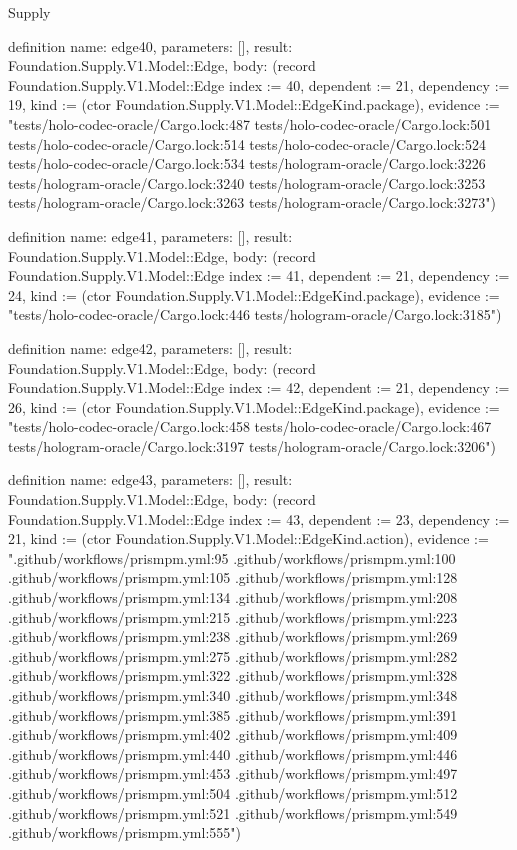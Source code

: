\begin{lexlean}{Supply}
\begin{semanticmodule}
definition{
  name: edge40,
  parameters: [],
  result: Foundation.Supply.V1.Model::Edge,
  body: (record Foundation.Supply.V1.Model::Edge {index := 40, dependent := 21, dependency := 19, kind := (ctor Foundation.Supply.V1.Model::EdgeKind.package), evidence := "tests/holo-codec-oracle/Cargo.lock:487 tests/holo-codec-oracle/Cargo.lock:501 tests/holo-codec-oracle/Cargo.lock:514 tests/holo-codec-oracle/Cargo.lock:524 tests/holo-codec-oracle/Cargo.lock:534 tests/hologram-oracle/Cargo.lock:3226 tests/hologram-oracle/Cargo.lock:3240 tests/hologram-oracle/Cargo.lock:3253 tests/hologram-oracle/Cargo.lock:3263 tests/hologram-oracle/Cargo.lock:3273"})
}

definition{
  name: edge41,
  parameters: [],
  result: Foundation.Supply.V1.Model::Edge,
  body: (record Foundation.Supply.V1.Model::Edge {index := 41, dependent := 21, dependency := 24, kind := (ctor Foundation.Supply.V1.Model::EdgeKind.package), evidence := "tests/holo-codec-oracle/Cargo.lock:446 tests/hologram-oracle/Cargo.lock:3185"})
}

definition{
  name: edge42,
  parameters: [],
  result: Foundation.Supply.V1.Model::Edge,
  body: (record Foundation.Supply.V1.Model::Edge {index := 42, dependent := 21, dependency := 26, kind := (ctor Foundation.Supply.V1.Model::EdgeKind.package), evidence := "tests/holo-codec-oracle/Cargo.lock:458 tests/holo-codec-oracle/Cargo.lock:467 tests/hologram-oracle/Cargo.lock:3197 tests/hologram-oracle/Cargo.lock:3206"})
}

definition{
  name: edge43,
  parameters: [],
  result: Foundation.Supply.V1.Model::Edge,
  body: (record Foundation.Supply.V1.Model::Edge {index := 43, dependent := 23, dependency := 21, kind := (ctor Foundation.Supply.V1.Model::EdgeKind.action), evidence := ".github/workflows/prismpm.yml:95 .github/workflows/prismpm.yml:100 .github/workflows/prismpm.yml:105 .github/workflows/prismpm.yml:128 .github/workflows/prismpm.yml:134 .github/workflows/prismpm.yml:208 .github/workflows/prismpm.yml:215 .github/workflows/prismpm.yml:223 .github/workflows/prismpm.yml:238 .github/workflows/prismpm.yml:269 .github/workflows/prismpm.yml:275 .github/workflows/prismpm.yml:282 .github/workflows/prismpm.yml:322 .github/workflows/prismpm.yml:328 .github/workflows/prismpm.yml:340 .github/workflows/prismpm.yml:348 .github/workflows/prismpm.yml:385 .github/workflows/prismpm.yml:391 .github/workflows/prismpm.yml:402 .github/workflows/prismpm.yml:409 .github/workflows/prismpm.yml:440 .github/workflows/prismpm.yml:446 .github/workflows/prismpm.yml:453 .github/workflows/prismpm.yml:497 .github/workflows/prismpm.yml:504 .github/workflows/prismpm.yml:512 .github/workflows/prismpm.yml:521 .github/workflows/prismpm.yml:549 .github/workflows/prismpm.yml:555"})
}


\end{semanticmodule}
\end{lexlean}
